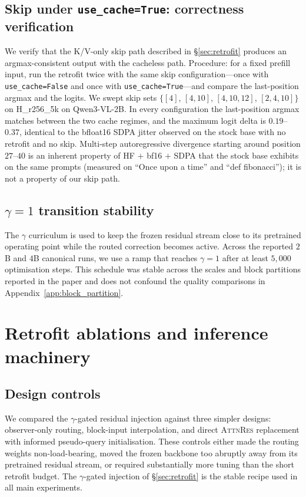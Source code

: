 \documentclass{article}
\newcommand{\attnres}{\textsc{AttnRes}}
\begin{document}
\subsection{\texorpdfstring{Skip under \texttt{use\_cache=True}: correctness verification}{Skip under use cache: correctness verification}}
\label{app:kv_equiv}
We verify that the K/V-only skip path described in \S\ref{sec:retrofit} produces an argmax-consistent output with the cacheless path. Procedure: for a fixed prefill input, run the retrofit twice with the same skip configuration---once with \texttt{use\_cache=False} and once with \texttt{use\_cache=True}---and compare the last-position argmax and the logits. We swept skip sets $\{[4]$, $[4,10]$, $[4,10,12]$, $[2,4,10]\}$ on H\_r256\_5k on Qwen3-VL-2B. In every configuration the last-position argmax matches between the two cache regimes, and the maximum logit delta is $0.19$--$0.37$, identical to the bfloat16 SDPA jitter observed on the stock base with no retrofit and no skip. Multi-step autoregressive divergence starting around position $27$--$40$ is an inherent property of HF $+$ bf16 $+$ SDPA that the stock base exhibits on the same prompts (measured on ``Once upon a time'' and ``def fibonacci''); it is not a property of our skip path.

\subsection{\texorpdfstring{$\gamma{=}1$ transition stability}{gamma=1 transition stability}}
\label{app:gamma_stability}
The $\gamma$ curriculum is used to keep the frozen residual stream close to its pretrained operating point while the routed correction becomes active. Across the reported $2$B and $4$B canonical runs, we use a ramp that reaches $\gamma{=}1$ after at least $5{,}000$ optimisation steps. This schedule was stable across the scales and block partitions reported in the paper and does not confound the quality comparisons in Appendix~\ref{app:block_partition}.

\section{Retrofit ablations and inference machinery}
\label{app:ablations}

\subsection{Design controls}
\label{app:route_ablations}
We compared the $\gamma$-gated residual injection against three simpler designs: observer-only routing, block-input interpolation, and direct \attnres{} replacement with informed pseudo-query initialisation. These controls either made the routing weights non-load-bearing, moved the frozen backbone too abruptly away from its pretrained residual stream, or required substantially more tuning than the short retrofit budget. The $\gamma$-gated injection of \S\ref{sec:retrofit} is the stable recipe used in all main experiments.
\end{document}
